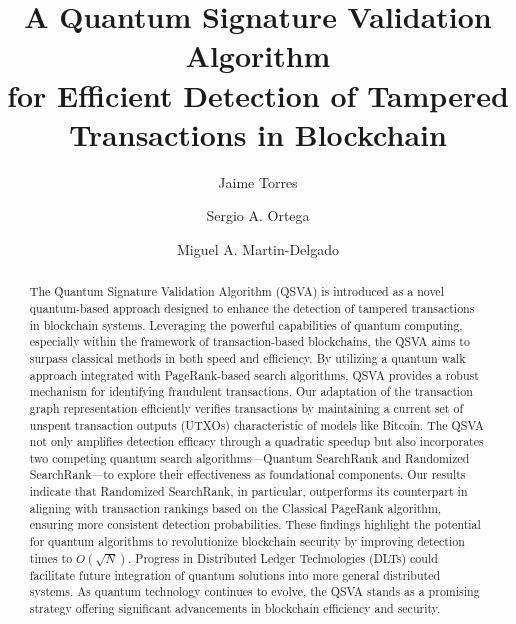 \documentclass[nofootinbib,aps,prd,reprint,superscriptaddress,floatfix]{revtex4-2}
\begin{document}
\title{A Quantum Signature Validation Algorithm \\ for Efficient Detection of Tampered Transactions in Blockchain}
\author{Jaime Torres }
\author{Sergio A. Ortega }
\author{Miguel A. Martin-Delgado }

\begin{abstract}
{The Quantum Signature Validation Algorithm (QSVA) is introduced as a novel quantum-based approach designed to enhance the detection of tampered transactions in blockchain systems. Leveraging the powerful capabilities of quantum computing, especially within the framework of transaction-based blockchains, the QSVA aims to surpass classical methods in both speed and efficiency. By utilizing a quantum walk approach integrated with PageRank-based search algorithms, QSVA provides a robust mechanism for identifying fraudulent transactions. Our adaptation of the transaction graph representation efficiently verifies transactions by maintaining a current set of unspent transaction outputs (UTXOs) characteristic of models like Bitcoin. The QSVA not only amplifies detection efficacy through a quadratic speedup but also incorporates two competing quantum search algorithms---Quantum SearchRank and Randomized SearchRank---to explore their effectiveness as foundational components. Our results indicate that Randomized SearchRank, in particular, outperforms its counterpart in aligning with transaction rankings based on the Classical PageRank algorithm, ensuring more consistent detection probabilities.  These findings highlight the potential for quantum algorithms to revolutionize blockchain security by improving detection times to $O(\sqrt{N})$. Progress in Distributed Ledger Technologies (DLTs) could facilitate future integration of quantum solutions into more general distributed systems. As quantum technology continues to evolve, the QSVA stands as a promising strategy offering significant advancements in blockchain efficiency and security.}
\end{abstract}

\maketitle
\end{document}

